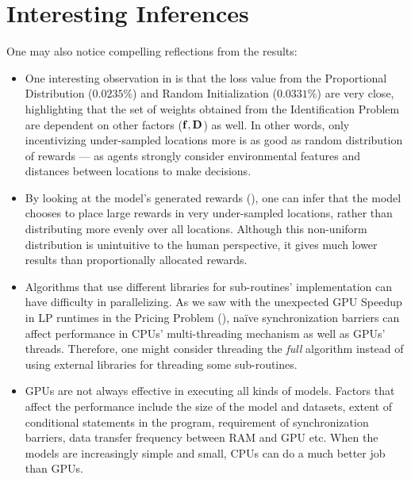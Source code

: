 \section{Interesting Inferences}
One may also notice compelling reflections from the results:
\begin{itemize}
    \item One interesting observation in  is that the loss value from the Proportional Distribution ($0.0235\%$) and Random Initialization ($0.0331\%$) are very close, highlighting that the set of weights obtained from the Identification Problem are dependent on other factors ($\mathbf{f}, \mathbf{D}$) as well. In other words, only incentivizing under-sampled locations more is as good as random distribution of rewards --- as agents strongly consider environmental features and distances between locations to make decisions.
    
    \item By looking at the model's generated rewards (), one can infer that the model chooses to place large rewards in very under-sampled locations, rather than distributing more evenly over all locations. Although this non-uniform distribution is unintuitive to the human perspective, it gives much lower results than proportionally allocated rewards.
    
    \item Algorithms that use different libraries for sub-routines' implementation can have difficulty in parallelizing. As we saw with the unexpected GPU Speedup in LP runtimes in the Pricing Problem (), na\"ive synchronization barriers can affect performance in CPUs' multi-threading mechanism as well as GPUs' threads. Therefore, one might consider threading the \textit{full} algorithm instead of using external libraries for threading some sub-routines.
    
    \item GPUs are not always effective in executing all kinds of models. Factors that affect the performance include the size of the model and datasets, extent of conditional statements in the program, requirement of synchronization barriers, data transfer frequency between RAM and GPU etc. When the models are increasingly simple and small, CPUs can do a much better job than GPUs.
\end{itemize}
